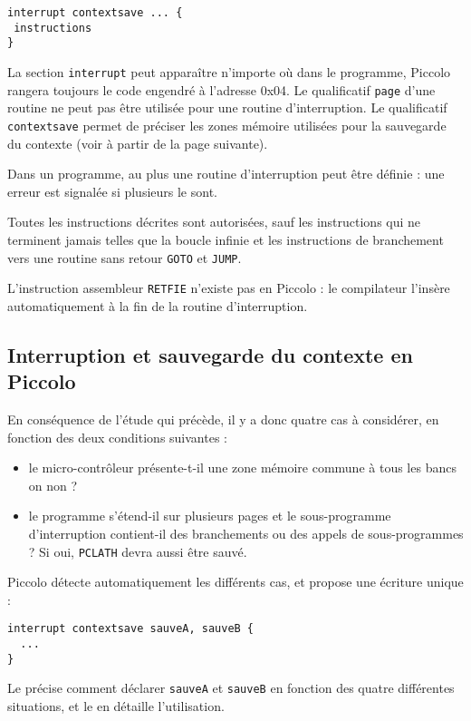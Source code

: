 \begin{lstlisting}[language=piccolo]
interrupt contextsave ... {
 instructions
}
\end{lstlisting}

La section \texttt{interrupt} peut apparaître n’importe où dans le programme, Piccolo rangera toujours le code engendré à l’adresse 0x04. Le qualificatif \texttt{page} d’une routine ne peut pas être utilisée pour une routine d’interruption. Le qualificatif \texttt{contextsave} permet de préciser les zones mémoire utilisées pour la sauvegarde du contexte (voir à partir de la page suivante).

Dans un programme, au plus une routine d’interruption peut être définie : une erreur est signalée si plusieurs le sont.

Toutes les instructions décrites sont autorisées, sauf les instructions qui ne terminent jamais telles que la boucle infinie et les instructions de branchement vers une routine sans retour \texttt{GOTO} et \texttt{JUMP}.

L’instruction assembleur \texttt{RETFIE} n’existe pas en Piccolo : le compilateur l’insère automatiquement à la fin de la routine d’interruption.

\subsection{Interruption et sauvegarde du contexte en Piccolo}

En conséquence de l'étude qui précède, il y a donc quatre cas à considérer, en fonction des deux conditions suivantes :
\begin{itemize}
  \item le micro-contrôleur présente-t-il une zone mémoire commune à tous les bancs on non ?
  \item le programme s’étend-il sur plusieurs pages et le sous-programme d’interruption contient-il des branchements ou des appels de sous-programmes ? Si oui, \texttt{PCLATH} devra aussi être sauvé.
\end{itemize}


Piccolo détecte automatiquement les différents cas, et propose une écriture unique :
\begin{lstlisting}[language=piccolo]
interrupt contextsave sauveA, sauveB {
  ...
}
\end{lstlisting}

Le  précise comment déclarer \texttt{sauveA} et \texttt{sauveB} en fonction des quatre différentes situations, et le  en détaille l'utilisation.

